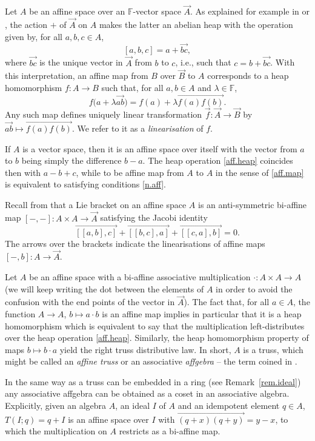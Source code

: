 \documentclass[pdftex]{sigma}
\numberwithin{equation}{section}
\newcommand{\F}{\mathbb F}
\begin{document}
Let $A$ be an affine space over an $\F$-vector space $\vec{A}$. As explained for example in \cite[Section~4]{BreBrz:hea} or \cite{Brz:Lie},
the action $+$ of $\vec{A}$ on $A$ makes the latter an abelian heap with the operation given by, for all $a,b,c \in A$,
\begin{equation}\label{aff.heap}
 [a,b,c] = a + \overrightarrow{bc},
\end{equation}
where $\overrightarrow{bc}$ is the unique vector in $\vec{A}$ from $b$ to $c$, i.e., such that $c = b+ \overrightarrow{bc}$.
With this interpretation, an affine map from $B$ over $\vec{B}$ to $A$ corresponds to a heap homomorphism $f\colon A\to B$ such that, for all $a,b\in A$ and $\lambda \in \F$,
\begin{equation}\label{aff.map}
 f\big(a + \lambda \overrightarrow{ab}\big) = f(a) + \lambda \overrightarrow{f(a)f(b)}.
\end{equation}
Any such map defines uniquely linear transformation $\vec{f}\colon \vec{A} \to \vec{B}$ by $\overrightarrow{ab}\mapsto \overrightarrow{f(a)f(b)}$. We refer to it as a \textit{linearisation} of $f$.

If $A$ is a vector space, then it is an affine space over itself with the vector from $a$ to $b$ being simply the difference $b-a$. The heap operation \eqref{aff.heap} coincides then with $a-b+c$, while to be affine map from $A$ to $A$ in the sense of \eqref{aff.map} is equivalent to satisfying conditions \eqref{n.aff}.

Recall from \cite[Definition~1]{GraGra:Lie} that a Lie bracket on an affine space $A$ is an anti-symmetric bi-affine map $[-,-]\colon A\times A\to \vec{A}$ satisfying the Jacobi identity
\[
\overrightarrow{[[a,b],c]} + \overrightarrow{[[b,c],a]} +\overrightarrow{[[c,a],b]} =0.
\]
The arrows over the brackets indicate the linearisations of affine maps $[-,b]\colon A\to \vec{A}$.

Let $A$ be an affine space with a bi-affine associative multiplication $\cdot\colon A\times A \to A$ (we will keep writing the dot between the elements of $A$ in order to avoid the confusion with the end points of the vector in $\vec{A}$). The fact that, for all $a\in A$, the function $A\to A$, $b\mapsto a\cdot b$ is an affine map implies in particular that it is a heap homomorphism which is equivalent to say that the multiplication left-distributes over the heap operation \eqref{aff.heap}. Similarly, the heap homomorphism property of maps $b\mapsto b\cdot a$ yield the right truss distributive law. In short, $A$ is a truss, which might be called an \textit{affine truss} or an associative \textit{affgebra} -- the term coined in \cite{GraGra:Lie}.
\begin{Remark}\label{rem.ideal.aff}
In the same way as a truss can be embedded in a ring (see Remark~\ref{rem.ideal}) any associative affgebra can be obtained as a coset in an associative algebra. Explicitly, given an algebra $A$, an ideal $I$ of $A$ and an idempotent element $q\in A$, $T(I;q) = q+I$ is an affine space over $I$ with $\overrightarrow{(q +x)(q+y)}= y-x$, to which the multiplication on $A$ restricts as a bi-affine map.
\end{Remark}
\end{document}
